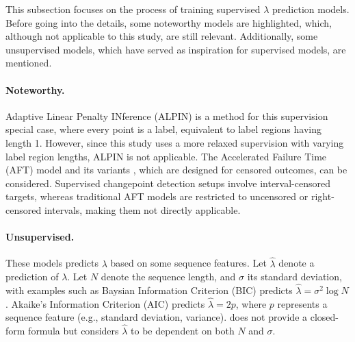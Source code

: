 \documentclass[12pt]{article}
\begin{document}
This subsection focuses on the process of training supervised $\lambda$ prediction models.
Before going into the details, some noteworthy models are highlighted, which, although not applicable to this study, are still relevant. 
Additionally, some unsupervised models, which have served as inspiration for supervised models, are mentioned.

\paragraph{Noteworthy.} Adaptive Linear Penalty INference (ALPIN) \citep{truong17} is a method for this supervision special case, where every point is a label, equivalent to label regions having length 1.
However, since this study uses a more relaxed supervision with varying label region lengths, ALPIN is not applicable.
The Accelerated Failure Time (AFT) model \citep{aft} and its variants \citep{aft_cai2009regularized, aft_huang2006regularized, quinlan1986induction, svm}, which are designed for censored outcomes, can be considered.
Supervised changepoint detection setups involve interval-censored targets, whereas traditional AFT models are restricted to uncensored or right-censored intervals, making them not directly applicable. 

\paragraph{Unsupervised.} These models predicts $\lambda$ based on some sequence features.
Let $\hat{\lambda}$ denote a prediction of $\lambda$.
Let $N$ denote the sequence length, and $\sigma$ its standard deviation, with examples such as Baysian Information Criterion (BIC) \citep{bic} predicts $\hat{\lambda} = \sigma^2 \log N$.
Akaike's Information Criterion (AIC) \citep{aic} predicts $\hat{\lambda} = 2p$, where $ p $ represents a sequence feature (e.g., standard deviation, variance).
\citet{lavielle05} does not provide a closed-form formula but considers $\hat{\lambda}$ to be dependent on both $ N $ and $ \sigma $.
\end{document}

